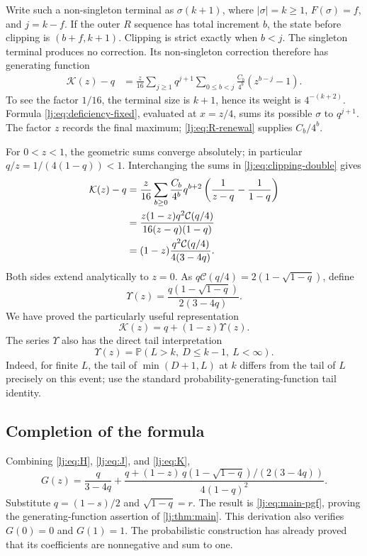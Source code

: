 \documentclass[11pt,a4paper]{article}
\theoremstyle{definition}\newaliascnt{definition}{theorem}
\theoremstyle{remark}\newaliascnt{remark}{theorem}
\newcommand{\Cat}{\mathcal C}
\newcommand{\ljP}{\mathbb P}
\newcommand{\ljK}{\mathcal K}
\newcommand{\ljU}{\Upsilon}
\begin{document}
Write such a non-singleton terminal as $\sigma(k+1)$, where
$|\sigma|=k\ge1$, $F(\sigma)=f$, and $j=k-f$. If the outer $R$ sequence
has total increment $b$, the state before clipping is $(b+f,k+1)$.
Clipping is strict exactly when $b<j$. The singleton terminal produces
no correction. Its non-singleton correction therefore has generating
function
\begin{align}
 \ljK(z)-q
 &=\frac z{16}\sum_{j\ge1}q^{j+1}
       \sum_{0\le b<j}\frac{C_b}{4^b}(z^{b-j}-1).
 \label{lj:eq:clipping-double}
\end{align}
To see the factor $1/16$, the terminal size is $k+1$, hence its weight
is $4^{-(k+2)}$. Formula \eqref{lj:eq:deficiency-fixed}, evaluated at
$x=z/4$, sums its possible $\sigma$ to $q^{j+1}$.
The factor $z$ records the final maximum; \eqref{lj:eq:R-renewal} supplies
$C_b/4^b$.

For $0<z<1$, the geometric sums converge absolutely; in particular
$q/z=1/(4(1-q))<1$. Interchanging the sums in
\eqref{lj:eq:clipping-double} gives
\begin{align}
 \ljK(z)-q
 &=\frac z{16}\sum_{b\ge0}\frac{C_b}{4^b}q^{b+2}
      \left(\frac1{z-q}-\frac1{1-q}\right)\notag\\
 &=\frac{z(1-z)q^2\Cat(q/4)}{16(z-q)(1-q)}\notag\\
 &=(1-z)\frac{q^2\Cat(q/4)}{4(3-4q)}.
 \label{lj:eq:clipping-sum}
\end{align}
Both sides extend analytically to $z=0$. As
$q\Cat(q/4)=2(1-\sqrt{1-q})$, define
\begin{equation}
 \ljU(z)=\frac{q(1-\sqrt{1-q})}{2(3-4q)}.
 \label{lj:eq:A}
\end{equation}
We have proved the particularly useful representation
\begin{equation}
 \boxed{\ljK(z)=q+(1-z)\ljU(z).}
 \label{lj:eq:K}
\end{equation}
The series $\ljU$ also has the direct tail interpretation
\begin{equation}
 [z^k]\ljU(z)=\ljP(L>k,\ D\le k-1,\ L<\infty).
 \label{lj:eq:A-probability}
\end{equation}
Indeed, for finite $L$, the tail of $\min(D+1,L)$ at $k$ differs
from the tail of $L$ precisely on this event; use the standard
probability-generating-function tail identity.

\subsection{Completion of the formula}
Combining \eqref{lj:eq:H}, \eqref{lj:eq:J}, and \eqref{lj:eq:K},
\begin{equation}
 G(z)=\frac{q}{3-4q}
 +\frac{q+(1-z)\,q(1-\sqrt{1-q})/(2(3-4q))}
       {4(1-q)^2}.
 \label{lj:eq:pgf-q}
\end{equation}
Substitute $q=(1-s)/2$ and $\sqrt{1-q}=r$. The result is
\eqref{lj:eq:main-pgf}, proving the generating-function assertion of
\cref{lj:thm:main}. This derivation also verifies $G(0)=0$ and $G(1)=1$.
The probabilistic construction has already proved that its coefficients
are nonnegative and sum to one.
\end{document}
